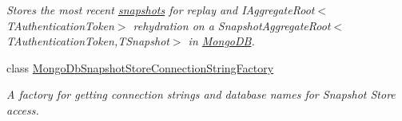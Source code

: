 \begin{DoxyCompactItemize}
\begin{DoxyCompactList}\small\item\em Stores the most recent \hyperlink{}{snapshots} for replay and I\+Aggregate\+Root$<$\+T\+Authentication\+Token$>$ rehydration on a Snapshot\+Aggregate\+Root$<$\+T\+Authentication\+Token,\+T\+Snapshot$>$ in \hyperlink{namespaceCqrs_1_1MongoDB}{Mongo\+DB}. \end{DoxyCompactList}\item 
class \hyperlink{classCqrs_1_1MongoDB_1_1Events_1_1MongoDbSnapshotStoreConnectionStringFactory}{Mongo\+Db\+Snapshot\+Store\+Connection\+String\+Factory}
\begin{DoxyCompactList}\small\item\em A factory for getting connection strings and database names for Snapshot Store access. \end{DoxyCompactList}\end{DoxyCompactItemize}
